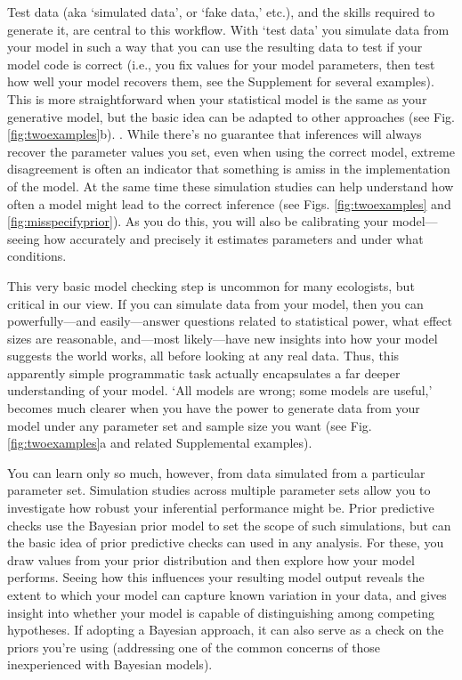 \documentclass[11pt]{article}
\newcommand{\R}[1]{\label{}\linelabel{#1}}
\begin{document}
Test data (aka `simulated data', or  `fake data,' etc.), and the skills required to generate it, are central to this workflow. With `test data' you simulate data from your model in such a way that you can use the resulting data to test if your model code is correct (i.e., you fix values for your model parameters, then test how well your model recovers them, see the Supplement for several examples). This is more straightforward when your statistical model is the same as your generative model, but the basic idea can be adapted to other approaches (see Fig. \ref{fig:twoexamples}b).\R{beyondMCMC5} . While there's no guarantee that inferences will always recover the parameter values you set, even when using the correct model, extreme disagreement is often an indicator that something is amiss in the implementation of the model. At the same time these simulation studies can help understand how often a model might lead to the correct inference (see Figs. \ref{fig:twoexamples} and \ref{fig:misspecifyprior}). As you do this, you will also be calibrating your model---seeing how accurately and precisely it estimates parameters and under what conditions. 

This very basic model checking step is uncommon for many ecologists, but critical in our view. If you can simulate data from your model, then you can powerfully---and easily---answer questions related to statistical power, what effect sizes are reasonable, and---most likely---have new insights into how your model suggests the world works, all before looking at any real data. Thus, this apparently simple programmatic task actually encapsulates a far deeper understanding of your model. `All models are wrong; some models are useful,' becomes much clearer when you have the power to generate data from your model under any parameter set and sample size you want (see Fig. \ref{fig:twoexamples}a and related Supplemental examples).

You can learn only so much, however, from data simulated from a particular parameter set. Simulation studies across multiple parameter sets allow you to investigate how robust your inferential performance might be. Prior predictive checks \citep{betanprior,winter2023} use the Bayesian prior model to set the scope of such simulations, but can the basic idea of prior predictive checks can used in any analysis. For these, you draw values from your prior distribution and then explore how your model performs. Seeing how this influences your resulting model output 
reveals the extent to which your model can capture known variation in your data, and gives insight into whether your model is capable of distinguishing among competing hypotheses. If adopting a Bayesian approach, it can also serve as a check on the priors you're using (addressing one of the common concerns of those inexperienced with Bayesian models). 
\end{document}
